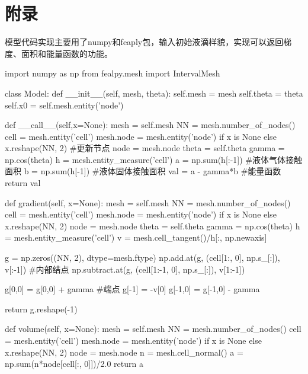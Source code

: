 \documentclass[12pt,oneside,a4paper]{article}
\begin{document}
\section*{附录}
模型代码实现主要用了numpy和feaply包，输入初始液滴样貌，实现可以返回梯度、面积和能量函数的功能。
\begin{python}
import numpy as np
from fealpy.mesh import IntervalMesh

class Model:
    def __init__(self, mesh, theta):
        self.mesh = mesh        
        self.theta = theta
        self.x0 = self.mesh.entity('node')  

    def __call__(self,x=None):
        mesh = self.mesh
        NN = mesh.number_of_nodes()
        cell = mesh.entity('cell')
        mesh.node = mesh.entity('node') if x is None else x.reshape(NN, 2)  #更新节点
        node = mesh.node
        theta = self.theta    
        gamma = np.cos(theta)
        h = mesh.entity_measure('cell')
        a = np.sum(h[:-1])    #液体气体接触面积
        b = np.sum(h[-1])     #液体固体接触面积
        val = a - gamma*b     #能量函数
        return val

    def gradient(self, x=None):
        mesh = self.mesh
        NN = mesh.number_of_nodes()
        cell = mesh.entity('cell')
        mesh.node = mesh.entity('node') if x is None else x.reshape(NN, 2)
        node = mesh.node
        theta = self.theta
        gamma = np.cos(theta)
        h = mesh.entity_measure('cell')
        v = mesh.cell_tangent()/h[:, np.newaxis]
        
        g = np.zeros((NN, 2), dtype=mesh.ftype)
        np.add.at(g, (cell[1:, 0], np.s_[:]), v[:-1])    #内部结点
        np.subtract.at(g, (cell[1:-1, 0], np.s_[:]), v[1:-1])
        
        g[0,0] = g[0,0] + gamma                          #端点
        g[-1]  = -v[0]
        g[-1,0] = g[-1,0] - gamma

        return g.reshape(-1)

    def volume(self, x=None):
        mesh = self.mesh
        NN = mesh.number_of_nodes()
        cell = mesh.entity('cell')
        mesh.node = mesh.entity('node') if x is None else x.reshape(NN, 2)
        node = mesh.node
        n = mesh.cell_normal()
        a = np.sum(n*node[cell[:, 0]])/2.0
        return a
\end{python}

 
\end{document}
